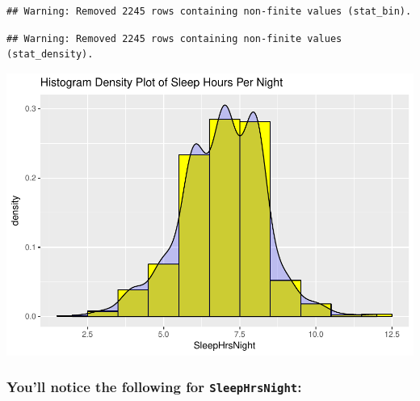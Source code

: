 \documentclass[]{article}
\newenvironment{Shaded}{\begin{snugshade}}{\end{snugshade}}
\newcommand{\KeywordTok}[1]{\textcolor[rgb]{0.13,0.29,0.53}{\textbf{{#1}}}}
\newcommand{\DataTypeTok}[1]{\textcolor[rgb]{0.13,0.29,0.53}{{#1}}}
\newcommand{\DecValTok}[1]{\textcolor[rgb]{0.00,0.00,0.81}{{#1}}}
\newcommand{\StringTok}[1]{\textcolor[rgb]{0.31,0.60,0.02}{{#1}}}
\newcommand{\CommentTok}[1]{\textcolor[rgb]{0.56,0.35,0.01}{\textit{{#1}}}}
\newcommand{\NormalTok}[1]{{#1}}
\begin{document}
\begin{Shaded}
\end{Shaded}

\begin{verbatim}
## Warning: Removed 2245 rows containing non-finite values (stat_bin).
\end{verbatim}

\begin{verbatim}
## Warning: Removed 2245 rows containing non-finite values (stat_density).
\end{verbatim}

\includegraphics{Hmwk7AnswerKey_files/figure-latex/unnamed-chunk-5-1.pdf}

\subsubsection{\texorpdfstring{You'll notice the following for
\texttt{SleepHrsNight}:}{You'll notice the following for SleepHrsNight:}}\label{youll-notice-the-following-for-sleephrsnight}
\end{document}
